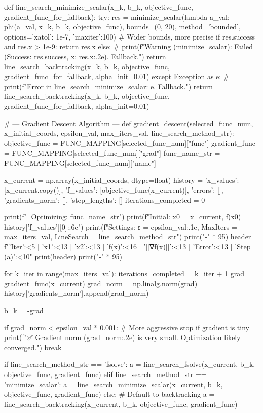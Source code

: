 \documentclass[12pt]{article} %
\begin{document}
\begin{python}
def line_search_minimize_scalar(x_k, b_k, objective_func, gradient_func_for_fallback):
    try:
        res = minimize_scalar(lambda a_val: phi(a_val, x_k, b_k, objective_func),
                              bounds=(0, 20), method='bounded', options={'xatol': 1e-7, 'maxiter':100}) # Wider bounds, more precise
        if res.success and res.x > 1e-9:
            return res.x
        else:
            # print(f"Warning (minimize_scalar): Failed (Success: {res.success}, x: {res.x:.2e}). Fallback.")
            return line_search_backtracking(x_k, b_k, objective_func, gradient_func_for_fallback, alpha_init=0.01)
    except Exception as e:
        # print(f"Error in line_search_minimize_scalar: {e}. Fallback.")
        return line_search_backtracking(x_k, b_k, objective_func, gradient_func_for_fallback, alpha_init=0.01)

# --- Gradient Descent Algorithm ---
def gradient_descent(selected_func_num, x_initial_coords, epsilon_val, max_iters_val, line_search_method_str):
    objective_func = FUNC_MAPPING[selected_func_num]["func"]
    gradient_func = FUNC_MAPPING[selected_func_num]["grad"]
    func_name_str = FUNC_MAPPING[selected_func_num]["name"]

    x_current = np.array(x_initial_coords, dtype=float)
    history = {
        'x_values': [x_current.copy()], 'f_values': [objective_func(x_current)],
        'errors': [], 'gradients_norm': [], 'step_lengths': []
    }
    iterations_completed = 0

    print(f"\n🚀 Optimizing: {func_name_str}")
    print(f"Initial: x0 = {x_current}, f(x0) = {history['f_values'][0]:.6e}")
    print(f"Settings: ε = {epsilon_val:.1e}, MaxIters = {max_iters_val}, LineSearch = {line_search_method_str}")
    print("-" * 95)
    header = f"{'Iter':<5} | {'x1':<13} | {'x2':<13} | {'f(x)':<16} | {'||∇f(x)||':<13} | {'Error':<13} | {'Step (a)':<10}"
    print(header)
    print("-" * 95)

    for k_iter in range(max_iters_val):
        iterations_completed = k_iter + 1
        grad = gradient_func(x_current)
        grad_norm = np.linalg.norm(grad)
        history['gradients_norm'].append(grad_norm)

        b_k = -grad 

        if grad_norm < epsilon_val * 0.001: # More aggressive stop if gradient is tiny
            print(f"\n✅ Gradient norm ({grad_norm:.2e}) is very small. Optimization likely converged.")
            break
        
        if line_search_method_str == 'fsolve':
            a = line_search_fsolve(x_current, b_k, objective_func, gradient_func)
        elif line_search_method_str == 'minimize_scalar':
            a = line_search_minimize_scalar(x_current, b_k, objective_func, gradient_func)
        else: # Default to backtracking
            a = line_search_backtracking(x_current, b_k, objective_func, gradient_func)
        

\end{python}
\end{document}
